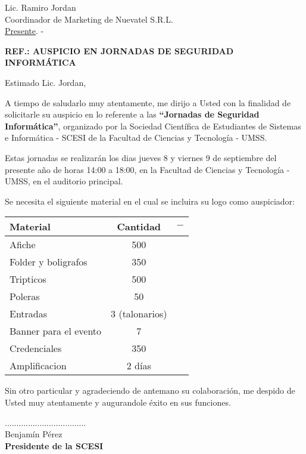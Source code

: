 \documentclass[letterpaper,12pt]{letter}
\begin{document}
\date {12 de agosto de 2011}

\begin{letter}{Lic. Ramiro Jordan \\ Coordinador de Marketing de Nuevatel S.R.L. \\\underline {Presente}. -}

\begin{center}
	\opening{\textbf{REF.: AUSPICIO EN JORNADAS DE SEGURIDAD INFORM\'ATICA}}
\end{center}

Estimado Lic. Jordan,

A tiempo de saludarlo muy atentamente, me dirijo a Usted con la finalidad de solicitarle su auspicio en lo referente 
a las {\bfseries ``Jornadas de Seguridad Inform\'atica''}, organizado por la Sociedad Cient\'ifica de Estudiantes de 
Sistemas e Inform\'atica - SCESI de la Facultad de Ciencias y Tecnolog\'ia - UMSS.

Estas jornadas se realizar\'an los dias jueves 8 y viernes 9 de septiembre del presente a\~no de horas 14:00 a 
18:00, en la Facultad de Ciencias y Tecnolog\'ia - UMSS, en el auditorio principal.

Se necesita el siguiente material en el cual se incluira su logo como auspiciador:

\begin{tabular}{|l|c|c|}
\hline
{\bfseries Material} & {\bfseries Cantidad} & $-$ \\
\hline
Afiche & 500 & \\
\hline
Folder y boligrafos & 350 & \\
\hline
Tripticos & 500 & \\
\hline
Poleras & 50 & \\
\hline
Entradas & 3 (talonarios) & \\
\hline
Banner para el evento & 7 & \\
\hline
Credenciales & 350 & \\
\hline
Amplificacion & 2 d\'ias & \\
\hline
\end{tabular}

Sin otro particular y agradeciendo de antemano su colaboraci\'on, me despido de Usted muy atentamente y augurandole \'exito en sus funciones.\\

\vspace{1cm}

\begin{center}
...................................\\
Benjam\'in P\'erez\\
{\bfseries Presidente de la  SCESI}
\end{center}

\end{letter}
\end{document}
